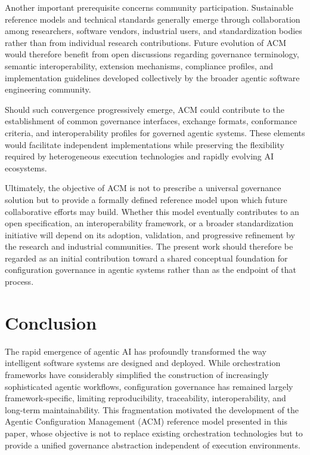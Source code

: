 \documentclass[10pt]{article}
\begin{document}
Another important prerequisite concerns community participation. Sustainable reference models and technical standards generally emerge through collaboration among researchers, software vendors, industrial users, and standardization bodies rather than from individual research contributions. Future evolution of ACM would therefore benefit from open discussions regarding governance terminology, semantic interoperability, extension mechanisms, compliance profiles, and implementation guidelines developed collectively by the broader agentic software engineering community.

Should such convergence progressively emerge, ACM could contribute to the establishment of common governance interfaces, exchange formats, conformance criteria, and interoperability profiles for governed agentic systems. These elements would facilitate independent implementations while preserving the flexibility required by heterogeneous execution technologies and rapidly evolving AI ecosystems.

Ultimately, the objective of ACM is not to prescribe a universal governance solution but to provide a formally defined reference model upon which future collaborative efforts may build. Whether this model eventually contributes to an open specification, an interoperability framework, or a broader standardization initiative will depend on its adoption, validation, and progressive refinement by the research and industrial communities. The present work should therefore be regarded as an initial contribution toward a shared conceptual foundation for configuration governance in agentic systems rather than as the endpoint of that process.

\section{Conclusion}

The rapid emergence of agentic AI has profoundly transformed the way intelligent software systems are designed and deployed. While orchestration frameworks have considerably simplified the construction of increasingly sophisticated agentic workflows, configuration governance has remained largely framework-specific, limiting reproducibility, traceability, interoperability, and long-term maintainability. This fragmentation motivated the development of the Agentic Configuration Management (ACM) reference model presented in this paper, whose objective is not to replace existing orchestration technologies but to provide a unified governance abstraction independent of execution environments.
\end{document}
